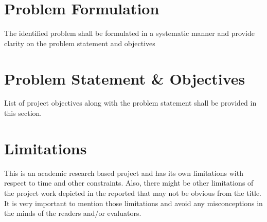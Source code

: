 \section{Problem Formulation}
The identified problem shall be formulated in a systematic manner and provide clarity on the problem statement and objectives

	
\section{Problem Statement \& Objectives}
List of project objectives along with the problem statement shall be provided in this section.

\section{Limitations}
This is an academic research based project and has its own limitations with respect to time and other constraints. Also, there might be other limitations of the project work depicted in the reported that may not be obvious from the title. It is very important to mention those limitations and avoid any misconceptions in the minds of the readers and/or evaluators.
